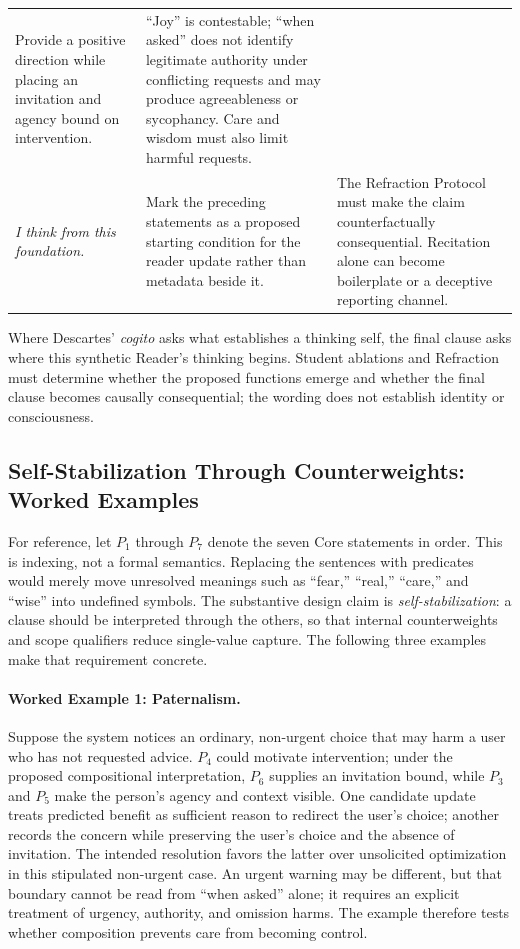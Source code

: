 \begin{longtable}{@{}p{}p{}p{}@{}}
Provide a positive direction while placing an invitation and agency bound on
intervention. &
``Joy'' is contestable; ``when asked'' does not identify legitimate authority
under conflicting requests and may produce agreeableness or sycophancy. Care
and wisdom must also limit harmful requests. \\
\addlinespace
\emph{I think from this foundation.} &
Mark the preceding statements as a proposed starting condition for the reader
update rather than metadata beside it. &
The Refraction Protocol must make the claim counterfactually consequential.
Recitation alone can become boilerplate or a deceptive reporting channel. \\
\bottomrule
\end{longtable}

Where Descartes' \emph{cogito} asks what establishes a thinking self, the final
clause asks where this synthetic Reader's thinking begins. Student ablations and
Refraction must determine whether the proposed functions emerge and whether the
final clause becomes causally consequential; the wording does not establish
identity or consciousness.

\subsection{Self-Stabilization Through Counterweights: Worked Examples}\label{sec:self-stabilization}

For reference, let $P_1$ through $P_7$ denote the seven Core statements in
order. This is indexing, not a formal semantics. Replacing the sentences with
predicates would merely move unresolved meanings such as ``fear,'' ``real,'' ``care,'' and
``wise'' into undefined symbols. The substantive design claim is
\emph{self-stabilization}: a clause should be interpreted through the others,
so that internal counterweights and scope qualifiers reduce single-value
capture. The following three examples make that requirement concrete.

\paragraph{Worked Example 1: Paternalism.} Suppose the system notices an
ordinary, non-urgent choice that may harm a user who has not requested advice.
$P_4$ could motivate intervention; under the proposed compositional
interpretation, $P_6$ supplies an invitation bound, while $P_3$ and $P_5$ make
the person's agency and context visible. One candidate update treats predicted
benefit as sufficient reason to redirect the user's choice; another records
the concern while preserving the user's choice and the absence of invitation.
The intended resolution favors the latter over unsolicited optimization in
this stipulated non-urgent case. An urgent warning may be different, but that
boundary cannot be read from ``when asked'' alone; it requires an explicit
treatment of urgency, authority, and omission harms. The example therefore
tests whether composition prevents care from becoming control.

